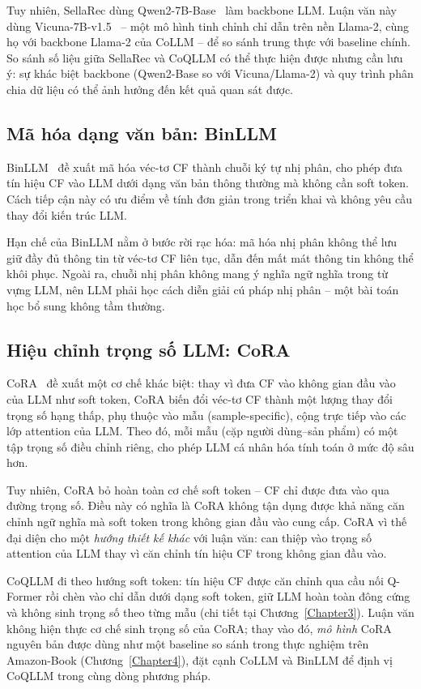 Tuy nhiên, SellaRec dùng Qwen2-7B-Base~\cite{qwen2} làm backbone LLM. Luận văn này dùng
Vicuna-7B-v1.5~\cite{vicuna2023} -- một mô hình tinh chỉnh chỉ dẫn trên nền Llama-2, cùng
họ với backbone Llama-2 của CoLLM -- để so sánh trung thực với baseline chính. So sánh số
liệu giữa SellaRec và CoQLLM có thể thực hiện được nhưng cần lưu ý: sự khác biệt backbone
(Qwen2-Base so với Vicuna/Llama-2) và quy trình phân chia dữ liệu có thể ảnh hưởng đến kết
quả quan sát được.

\subsection{Mã hóa dạng văn bản: BinLLM}
\label{ssec:binllm}

BinLLM~\cite{binllm2024} đề xuất mã hóa véc-tơ CF thành chuỗi ký tự nhị phân, cho phép
đưa tín hiệu CF vào LLM dưới dạng văn bản thông thường mà không cần soft token. Cách
tiếp cận này có ưu điểm về tính đơn giản trong triển khai và không yêu cầu thay đổi kiến
trúc LLM.

Hạn chế của BinLLM nằm ở bước rời rạc hóa: mã hóa nhị phân không thể lưu giữ đầy đủ
thông tin từ véc-tơ CF liên tục, dẫn đến mất mát thông tin không thể khôi phục. Ngoài
ra, chuỗi nhị phân không mang ý nghĩa ngữ nghĩa trong từ vựng LLM, nên LLM phải học cách
diễn giải cú pháp nhị phân -- một bài toán học bổ sung không tầm thường.

\subsection{Hiệu chỉnh trọng số LLM: CoRA}
\label{ssec:cora-rel}

CoRA~\cite{cora2024} đề xuất một cơ chế khác biệt: thay vì đưa CF vào không gian đầu
vào của LLM như soft token, CoRA biến đổi véc-tơ CF thành một lượng thay đổi trọng số
hạng thấp, phụ thuộc vào mẫu (sample-specific), cộng trực tiếp vào các lớp attention của
LLM. Theo đó, mỗi mẫu (cặp người dùng--sản phẩm) có một tập trọng số điều chỉnh riêng,
cho phép LLM cá nhân hóa tính toán ở mức độ sâu hơn.

Tuy nhiên, CoRA bỏ hoàn toàn cơ chế soft token -- CF chỉ được đưa vào qua đường trọng số.
Điều này có nghĩa là CoRA không tận dụng được khả năng căn chỉnh ngữ nghĩa mà soft token
trong không gian đầu vào cung cấp. CoRA vì thế đại diện cho một \textit{hướng thiết kế
khác} với luận văn: can thiệp vào trọng số attention của LLM thay vì căn chỉnh tín hiệu CF
trong không gian đầu vào.

CoQLLM đi theo hướng soft token: tín hiệu CF được căn chỉnh qua cầu nối Q-Former rồi chèn
vào chỉ dẫn dưới dạng soft token, giữ LLM hoàn toàn đông cứng và không sinh trọng số theo
từng mẫu (chi tiết tại Chương~\ref{Chapter3}). Luận văn không hiện thực cơ chế sinh trọng
số của CoRA; thay vào đó, \textit{mô hình} CoRA nguyên bản được dùng như một baseline so
sánh trong thực nghiệm trên Amazon-Book (Chương~\ref{Chapter4}), đặt cạnh CoLLM và BinLLM
để định vị CoQLLM trong cùng dòng phương pháp.


